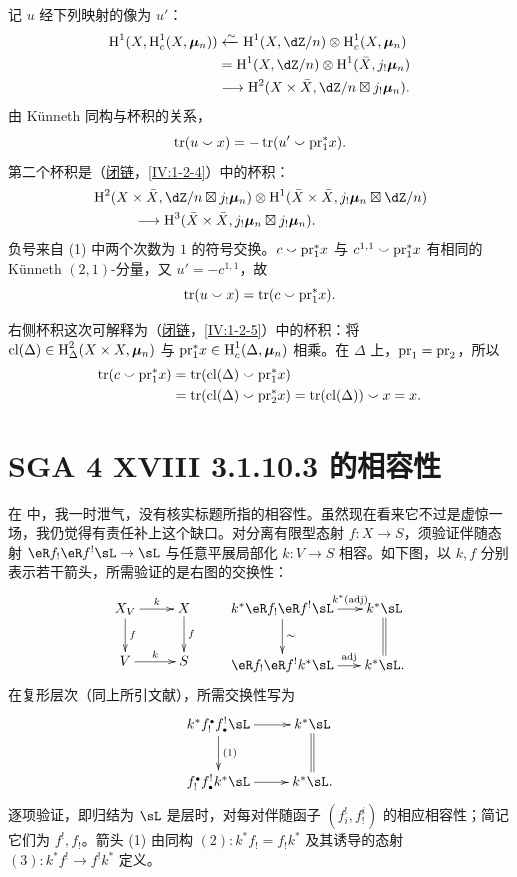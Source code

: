 记 $u$ 经下列映射的像为 $u'$：
\[
\begin{aligned}
\h^1(X,\h_c^1(X,\dmu_n))
&\xleftarrow{\sim}\h^1(X,\dZ/n)\otimes\h_c^1(X,\dmu_n)\\
&=\h^1(X,\dZ/n)\otimes\h^1(\bar X,j_!\dmu_n)\\
&\longrightarrow\h^2(X\times\bar X,\dZ/n\boxtimes j_!\dmu_n).
\end{aligned}
\]
由 Künneth 同构与杯积的关系，
\[
\operatorname{tr}(u\smallsmile x)=-\operatorname{tr}(u'\smallsmile\mathrm{pr}_1^*x).
\]
第二个杯积是（\hyperref[IV]{闭链}，\ref{IV:1-2-4}）中的杯积：
\[
\begin{aligned}
&\h^2(X\times\bar X,\dZ/n\boxtimes j_!\dmu_n)
\otimes\h^1(\bar X\times\bar X,j_!\dmu_n\boxtimes\dZ/n)\\
&\hspace{3em}\longrightarrow\h^3(\bar X\times\bar X,j_!\dmu_n\boxtimes j_!\dmu_n).
\end{aligned}
\]
负号来自 (1) 中两个次数为 $1$ 的符号交换。$c\smallsmile\mathrm{pr}_1^*x$ 与 $c^{1,1}\smallsmile\mathrm{pr}_1^*x$ 有相同的 Künneth $(2,1)$-分量，又 $u'=-c^{1,1}$，故
\[
\operatorname{tr}(u\smallsmile x)=\operatorname{tr}(c\smallsmile\mathrm{pr}_1^*x).
\]

右侧杯积这次可解释为（\hyperref[IV]{闭链}，\ref{IV:1-2-5}）中的杯积：将
$\operatorname{cl}(\Delta)\in\operatorname{H}_\Delta^2(X\times X,{\bm\mu}_n)$ 与
$\mathrm{pr}_1^*x\in\operatorname{H}_c^1(\Delta,{\bm\mu}_n)$ 相乘。在 $\Delta$ 上，$\mathrm{pr}_1=\mathrm{pr}_2$，所以
\[
\begin{aligned}
\operatorname{tr}(c\smallsmile\mathrm{pr}_1^*x)
&=\operatorname{tr}(\operatorname{cl}(\Delta)\smallsmile\mathrm{pr}_1^*x)\\
&=\operatorname{tr}(\operatorname{cl}(\Delta)\smallsmile\mathrm{pr}_2^*x)
=\operatorname{tr}(\operatorname{cl}(\Delta))\smallsmile x=x.
\end{aligned}
\]

\section{SGA 4 XVIII 3.1.10.3 的相容性}\label{V:4}
在 \cite[XVIII]{sga4} 中，我一时泄气，没有核实标题所指的相容性。虽然现在看来它不过是虚惊一场，我仍觉得有责任补上这个缺口。对分离有限型态射 $f:X\to S$，须验证伴随态射 $\eR f_!\eR f^!\sL\to\sL$ 与任意平展局部化 $k:V\to S$ 相容。如下图，以 $k,f$ 分别表示若干箭头，所需验证的是右图的交换性：
\[
\xymatrix{X_V\ar[r]^-k\ar[d]^-f&X\ar[d]^-f\\V\ar[r]^-k&S}
\qquad
\xymatrix@C=16pt{k^*\eR f_!\eR f^!\sL\ar[r]^-{k^*(\mathrm{adj})}\ar[d]^-\sim&k^*\sL\ar@{=}[d]\\
\eR f_!\eR f^!k^*\sL\ar[r]^-{\mathrm{adj}}&k^*\sL.}
\]
在复形层次（同上所引文献），所需交换性写为
\[\xymatrix{k^*f_!^\bullet f^!_\bullet\sL\ar[r]\ar[d]^-{(1)}&k^*\sL\ar@{=}[d]\\
f_!^\bullet f^!_\bullet k^*\sL\ar[r]&k^*\sL.}\]
逐项验证，即归结为 $\sL$ 是层时，对每对伴随函子 $(f_i^!,f_!^i)$ 的相应相容性；简记它们为 $f^!,f_!$。箭头 (1) 由同构 $(2):k^*f_!=f_!k^*$ 及其诱导的态射 $(3):k^*f^!\to f^!k^*$ 定义。

